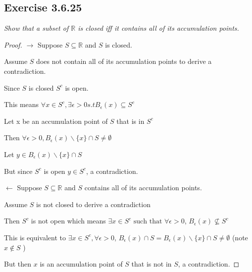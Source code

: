 \documentclass[12pt, a4paper]{article}
\begin{document}
    \subsection*{Exercise 3.6.25}
        \textit{Show that a subset of $\mathbb{R}$ is closed iff it contains all of its accumulation points.}
        \begin{proof}
            $\rightarrow$ Suppose $S\subseteq\mathbb{R}$ and $S$ is closed.
            
            Assume $S$ does not contain all of its accumulation points to derive a contradiction.

            Since $S$ is closed $S^c$ is open.

            This means $\forall x \in S^c, \exists \epsilon>0 s.t B_\epsilon(x) \subseteq S^c$

            Let x be an accumulation point of $S$ that is in $S^c$ 
            
            Then $\forall \epsilon > 0, B_\epsilon(x)\backslash \{x\}\cap S \not = \emptyset$

            Let $y \in B_\epsilon(x)\backslash \{x\}\cap S$

            But since $S^c$ is open $y \in S^c$, a contradiction.

            $\leftarrow$ Suppose $S\subseteq\mathbb{R}$ and $S$ contains all of its accumulation points.
            
            Assume $S$ is not closed to derive a contradiction

            Then $S^c$ is not open which means $\exists x \in S^c \text{ such that } \forall \epsilon>0$,  $B_\epsilon(x) \not\subseteq S^c$

            This is equivalent to $\exists x \in S^c, \forall \epsilon>0$, $ B_\epsilon(x) \cap S = B_\epsilon(x)\backslash\{x\} \cap S \not = \emptyset$ (note $x\not\in S$ )

            But then $x$ is an accumulation point of $S$ that is not in $S$, a contradiction.
     \end{proof}
     \pagebreak
\end{document}
